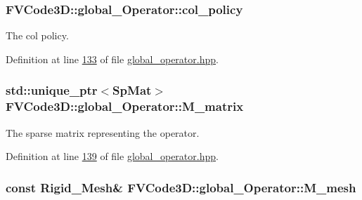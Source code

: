 \subsubsection[{\texorpdfstring{col\+\_\+policy}{col_policy}}]{ F\+V\+Code3\+D\+::global\+\_\+\+Operator\+::col\+\_\+policy\hspace{0.3cm}{\ttfamily [protected]}}\hypertarget{classFVCode3D_1_1global__Operator_a98d57128fb49513da10f3ba6fcbfa839}{}\label{classFVCode3D_1_1global__Operator_a98d57128fb49513da10f3ba6fcbfa839}


The col policy. 



Definition at line \hyperlink{global__operator_8hpp_source_l00133}{133} of file \hyperlink{global__operator_8hpp_source}{global\+\_\+operator.\+hpp}.

\subsubsection[{\texorpdfstring{M\+\_\+matrix}{M_matrix}}]{\setlength{\rightskip}{0pt plus 5cm}std\+::unique\+\_\+ptr$<${\bf Sp\+Mat}$>$ F\+V\+Code3\+D\+::global\+\_\+\+Operator\+::\+M\+\_\+matrix\hspace{0.3cm}{\ttfamily [protected]}}\hypertarget{classFVCode3D_1_1global__Operator_ab45426efec09f5245e9107794eb7bbd9}{}\label{classFVCode3D_1_1global__Operator_ab45426efec09f5245e9107794eb7bbd9}


The sparse matrix representing the operator. 



Definition at line \hyperlink{global__operator_8hpp_source_l00139}{139} of file \hyperlink{global__operator_8hpp_source}{global\+\_\+operator.\+hpp}.

\subsubsection[{\texorpdfstring{M\+\_\+mesh}{M_mesh}}]{\setlength{\rightskip}{0pt plus 5cm}const {\bf Rigid\+\_\+\+Mesh}\& F\+V\+Code3\+D\+::global\+\_\+\+Operator\+::\+M\+\_\+mesh\hspace{0.3cm}{\ttfamily [protected]}}\hypertarget{classFVCode3D_1_1global__Operator_a027911d0f801f6f19a3006329ec30a7f}{}\label{classFVCode3D_1_1global__Operator_a027911d0f801f6f19a3006329ec30a7f}


